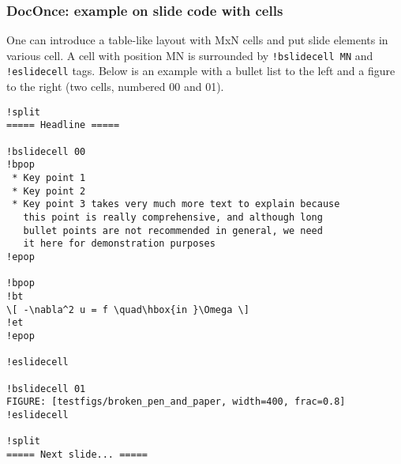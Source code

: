 \documentclass{beamer}
\begin{document}
\begin{frame}
\frametitle{DocOnce: example on slide code with cells}

One can introduce a table-like layout with MxN cells and
put slide elements in various cell. A cell with position
MN is surrounded by \Verb?!bslidecell MN? and \Verb?!eslidecell?
tags. Below is an example with a bullet list to the left and
a figure to the right (two cells, numbered 00 and 01).





























\begin{Verbatim}[numbers=none,fontsize=\fontsize{9pt}{9pt},baselinestretch=0.95]
!split
===== Headline =====

!bslidecell 00
!bpop
 * Key point 1
 * Key point 2
 * Key point 3 takes very much more text to explain because
   this point is really comprehensive, and although long
   bullet points are not recommended in general, we need
   it here for demonstration purposes
!epop

!bpop
!bt
\[ -\nabla^2 u = f \quad\hbox{in }\Omega \]
!et
!epop

!eslidecell

!bslidecell 01
FIGURE: [testfigs/broken_pen_and_paper, width=400, frac=0.8]
!eslidecell

!split
===== Next slide... =====

\end{Verbatim}
\end{frame}
\end{document}
